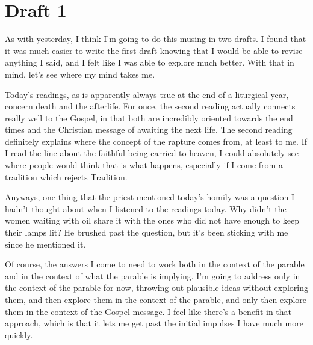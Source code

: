 \documentclass[12pt]{article}[titlepage]
\newcommand{\1}{\={a}}
\newcommand{\2}{\={e}}
\newcommand{\3}{\={\i}}
\newcommand{\4}{\=o}
\newcommand{\5}{\=u}
\newcommand{\6}{\={A}}
\renewcommand{\,}{\textsuperscript{,}}
\begin{document}
\section{Draft 1}
As with yesterday, I think I'm going to do this musing in two drafts.
I found that it was much easier to write the first draft knowing that I would be able to revise anything I said, and I felt like I was able to explore much better.
With that in mind, let's see where my mind takes me.

Today's readings, as is apparently always true at the end of a liturgical year, concern death and the afterlife.
For once, the second reading actually connects really well to the Gospel, in that both are incredibly oriented towards the end times and the Christian message of awaiting the next life.
The second reading definitely explains where the concept of the rapture comes from, at least to me.
If I read the line about the faithful being carried to heaven, I could absolutely see where people would think that is what happens, especially if I come from a tradition which rejects Tradition.

Anyways, one thing that the priest mentioned today's homily was a question I hadn't thought about when I listened to the readings today.
Why didn't the women waiting with oil share it with the ones who did not have enough to keep their lamps lit?
He brushed past the question, but it's been sticking with me since he mentioned it.

Of course, the answers I come to need to work both in the context of the parable and in the context of what the parable is implying.
I'm going to address only in the context of the parable for now, throwing out plausible ideas without exploring them, and then explore them in the context of the parable, and only then explore them in the context of the Gospel message.
I feel like there's a benefit in that approach, which is that it lets me get past the initial impulses I have much more quickly.
\end{document}
